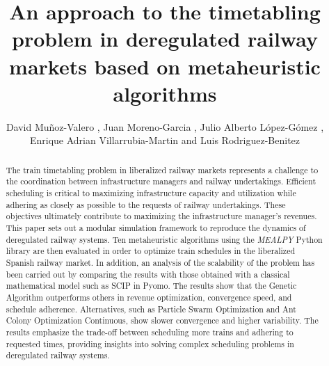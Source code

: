 \documentclass[Afour,sagev,times]{sagej}
\begin{document}
\title{An approach to the timetabling problem in deregulated railway markets based on metaheuristic algorithms}

\author{
David Muñoz-Valero ,
Juan Moreno-Garcia ,
Julio Alberto López-Gómez ,
Enrique Adrian Villarrubia-Martin 
and 
Luis Rodriguez-Benitez %
}



\begin{abstract}
The train timetabling problem in liberalized railway markets represents a challenge to the coordination between infrastructure managers and railway undertakings. Efficient scheduling is critical to maximizing infrastructure capacity and utilization while adhering as closely as possible to the requests of railway undertakings. These objectives ultimately contribute to maximizing the infrastructure manager's revenues. This paper sets out a modular simulation framework to reproduce the dynamics of deregulated railway systems. Ten metaheuristic algorithms using the \textit{MEALPY} Python library are then evaluated in order to optimize train schedules in the liberalized Spanish railway market. In addition, an analysis of the scalability of the problem has been carried out by comparing the results with those obtained with a classical mathematical model such as SCIP in Pyomo. The results show that the Genetic Algorithm outperforms others in revenue optimization, convergence speed, and schedule adherence. Alternatives, such as Particle Swarm Optimization and Ant Colony Optimization Continuous, show slower convergence and higher variability. The results emphasize the trade-off between scheduling more trains and adhering to requested times, providing insights into solving complex scheduling problems in deregulated railway systems.
\end{abstract}

\end{document}
